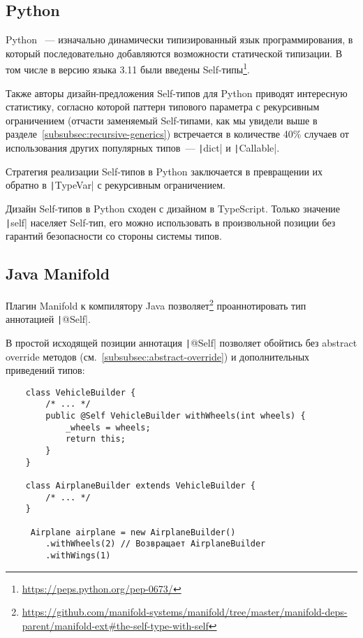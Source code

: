 \subsection{Python}

Python~\cite{sanner1999python} --- изначально динамически типизированный язык программирования, в который последовательно добавляются возможности статической типизации.
В том числе в версию языка 3.11 были введены Self-типы\footnote{\url{https://peps.python.org/pep-0673/}\label{foot:self-pep}}.

Также авторы дизайн-предложения Self-типов для Python приводят интересную статистику, согласно которой паттерн типового параметра с рекурсивным ограничением (отчасти заменяемый Self-типами, как мы увидели выше в разделе~\ref{subsubsec:recursive-generics}) встречается в количестве 40\% случаев от использования других популярных типов~--- \texttt|dict| и \texttt|Callable|.

Стратегия реализации Self-типов в Python заключается в превращении их обратно в \texttt|TypeVar| с рекурсивным ограничением.

Дизайн Self-типов в Python сходен с дизайном в TypeScript.
Только значение \texttt|self| населяет Self-тип, его можно использовать в произвольной позиции без гарантий безопасности со стороны системы типов.


\subsection{Java Manifold}

Плагин Manifold к компилятору Java позволяет\footnote{\url{https://github.com/manifold-systems/manifold/tree/master/manifold-deps-parent/manifold-ext\#the-self-type-with-self}} проаннотировать тип аннотацией \texttt|@Self|.

В простой исходящей позиции аннотация \texttt|@Self| позволяет обойтись без abstract override методов (см.~\ref{subsubsec:abstract-override}) и дополнительных приведений типов:

\begin{verbatim}
    class VehicleBuilder {
        /* ... */
        public @Self VehicleBuilder withWheels(int wheels) {
            _wheels = wheels;
            return this;
        }
    }

    class AirplaneBuilder extends VehicleBuilder {
        /* ... */
    }

     Airplane airplane = new AirplaneBuilder()
        .withWheels(2) // Возвращает AirplaneBuilder
        .withWings(1)
\end{verbatim}

